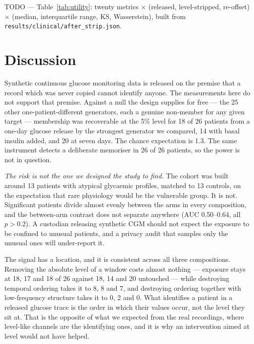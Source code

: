 \documentclass[pdflatex,sn-nature]{sn-jnl}
\theoremstyle{thmstyleone}
\begin{document}
TODO --- Table~\ref{tab:utility}: twenty metrics $\times$ (released,
level-stripped, re-offset) $\times$ (median, interquartile range, KS, Wasserstein),
built from \texttt{results/clinical/after\_strip.json}.
\section{Discussion}\label{sec:discussion}

Synthetic continuous glucose monitoring data is released on the premise that a
record which was never copied cannot identify anyone. The measurements here do
not support that premise. Against a null the design supplies for free --- the 25
other one-patient-different generators, each a genuine non-member for any given
target --- membership was recoverable at the 5\% level for 18 of 26 patients
from a one-day glucose release by the strongest generator we compared, 14 with
basal insulin added, and 20 at seven days. The chance expectation is 1.3. The
same instrument detects a deliberate memoriser in 26 of 26 patients, so the
power is not in question.

\emph{The risk is not the one we designed the study to find.} The cohort was
built around 13 patients with atypical glycaemic profiles, matched to 13
controls, on the expectation that rare physiology would be the vulnerable
group. It is not. Significant patients divide almost evenly between the arms in
every composition, and the between-arm contrast does not separate anywhere
(AUC 0.50--0.64, all $p>0.2$). A custodian releasing synthetic CGM should not
expect the exposure to be confined to unusual patients, and a privacy audit
that samples only the unusual ones will under-report it.

The signal has a location, and it is consistent across all three
compositions. Removing the absolute level of a window costs almost nothing ---
exposure stays at 18, 17 and 18 of 26 against 18, 14 and 20 untouched --- while
destroying temporal ordering takes it to 8, 8 and 7, and destroying ordering
together with low-frequency structure takes it to 0, 2 and 0. What identifies a
patient in a released glucose trace is the order in which their values occur,
not the level they sit at. That is the opposite of what we expected from the
real recordings, where level-like channels are the identifying ones, and it is
why an intervention aimed at level would not have helped.
\end{document}
